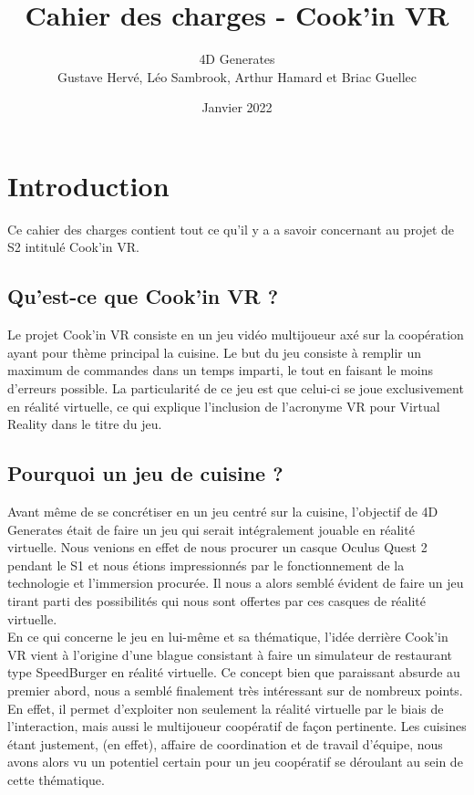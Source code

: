 \documentclass{article}
\title{Cahier des charges - Cook'in VR}
\author{4D Generates\\Gustave Hervé, Léo Sambrook, Arthur Hamard et Briac Guellec}
\date{Janvier 2022}
\begin{document}
\maketitle
\newpage

\renewcommand*\contentsname{Table des matières}
\tableofcontents
\newpage

\section{Introduction}

    Ce cahier des charges contient tout ce qu'il y a a savoir concernant au projet de S2 intitulé Cook'in VR.

\subsection{Qu’est-ce que Cook’in VR ?}

	Le projet Cook’in VR consiste en un jeu vidéo multijoueur axé sur la coopération ayant pour thème principal la cuisine. Le but du jeu consiste à remplir un maximum de commandes dans un temps imparti, le tout en faisant le moins d'erreurs possible. La particularité de ce jeu est que celui-ci se joue exclusivement en réalité virtuelle, ce qui explique l’inclusion de l’acronyme VR pour Virtual Reality dans le titre du jeu.

\subsection{Pourquoi un jeu de cuisine ?}

	Avant même de se concrétiser en un jeu centré sur la cuisine, l’objectif de 4D Generates était de faire un jeu qui serait intégralement jouable en réalité virtuelle. Nous venions en effet de nous procurer un casque Oculus Quest 2 pendant le S1 et nous étions impressionnés par le fonctionnement de la technologie et l’immersion procurée. Il nous a alors semblé évident de faire un jeu tirant parti des possibilités qui nous sont offertes par ces casques de réalité virtuelle.\\

En ce qui concerne le jeu en lui-même et sa thématique, l'idée derrière Cook’in VR vient à l'origine d'une blague consistant à faire un simulateur de restaurant type SpeedBurger en réalité virtuelle. Ce concept bien que paraissant absurde au premier abord, nous a semblé finalement très intéressant sur de nombreux points. En effet, il permet d’exploiter non seulement la réalité virtuelle par le biais de l’interaction, mais aussi le multijoueur coopératif de façon pertinente. Les cuisines étant justement, (en effet), affaire de coordination et de travail d’équipe, nous avons alors vu un potentiel certain pour un jeu coopératif se déroulant au sein de cette thématique.
\end{document}
